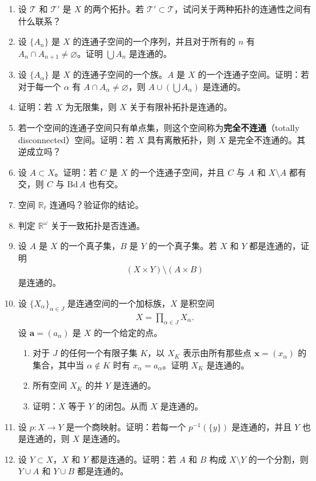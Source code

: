 \documentclass[../../main.tex]{subfiles}
\begin{document}
\begin{enumerate}
\item 设 $\mathscr{T}$ 和 $\mathscr{T}'$ 是 $X$ 的两个拓扑。若 $\mathscr{T}'\subset\mathscr{T}$，试问关于两种拓扑的连通性之间有什么联系？
\item 设 $\{A_{n}\}$ 是 $X$ 的连通子空间的一个序列，并且对于所有的 $n$ 有 $A_{n}\cap A_{n+1}\neq\varnothing$。证明 $\bigcup A_{n}$ 是连通的。
\item 设 $\{A_{\alpha}\}$ 是 $X$ 的连通子空间的一个族。$A$ 是 $X$ 的一个连通子空间。证明：若对于每一个 $\alpha$ 有 $A\cap A_{\alpha}\neq\varnothing$，则 $A\cup(\bigcup A_{\alpha})$ 是连通的。
\item 证明：若 $X$ 为无限集，则 $X$ 关于有限补拓扑是连通的。
\item 若一个空间的连通子空间只有单点集，则这个空间称为\textbf{完全不连通}（totally disconnected）空间。证明：若 $X$ 具有离散拓扑，则 $X$ 是完全不连通的。其逆成立吗？
\item 设 $A\subset X$。证明：若 $C$ 是 $X$ 的一个连通子空间，并且 $C$ 与 $A$ 和 $X\setminus A$ 都有交，则 $C$ 与 $\mathrm{Bd}\,A$ 也有交。
\item 空间 $\mathbb{R}_{\ell}$ 连通吗？验证你的结论。
\item 判定 $\mathbb{R}^{\omega}$ 关于一致拓扑是否连通。
\item 设 $A$ 是 $X$ 的一个真子集，$B$ 是 $Y$ 的一个真子集。若 $X$ 和 $Y$ 都是连通的，证明
\begin{align*}
(X\times Y)\setminus(A\times B)
\end{align*}
是连通的。
\item 设 $\{X_{\alpha}\}_{\alpha\in J}$ 是连通空间的一个加标族，$X$ 是积空间
\begin{align*}
X=\prod_{\alpha\in J}X_{\alpha}.
\end{align*}
设 $\boldsymbol{a}=(a_{\alpha})$ 是 $X$ 的一个给定的点。
\begin{enumerate}
\item 对于 $J$ 的任何一个有限子集 $K$，以 $X_{K}$ 表示由所有那些点 $\boldsymbol{x}=(x_{\alpha})$ 的集合，其中当 $\alpha\notin K$ 时有 $x_{\alpha}=a_{\alpha}$。证明 $X_{K}$ 是连通的。
\item 所有空间 $X_{K}$ 的并 $Y$ 是连通的。
\item 证明：$X$ 等于 $Y$ 的闭包。从而 $X$ 是连通的。
\end{enumerate}
\item 设 $p\colon X\to Y$ 是一个商映射。证明：若每一个 $p^{-1}(\{y\})$ 是连通的，并且 $Y$ 也是连通的，则 $X$ 是连通的。
\item 设 $Y\subset X$，$X$ 和 $Y$ 都是连通的。证明：若 $A$ 和 $B$ 构成 $X\setminus Y$ 的一个分割，则 $Y\cup A$ 和 $Y\cup B$ 都是连通的。
\end{enumerate}
\end{document}
